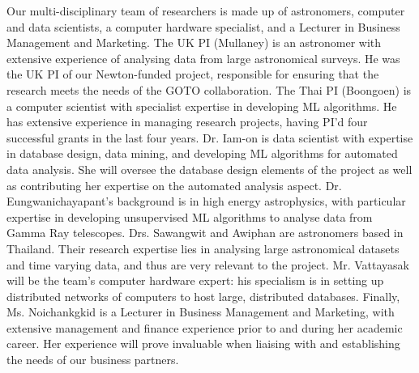 \documentclass[11pt]{article}
\begin{document}
  \noindent
  Our multi-disciplinary team of researchers is made up of astronomers, computer and data scientists, a computer hardware specialist, and a Lecturer in Business Management and Marketing. The UK PI (Mullaney) is an astronomer with extensive experience of analysing data from large astronomical surveys. He was the UK PI of our Newton-funded project, responsible for ensuring that the research meets the needs of the GOTO collaboration. The Thai PI (Boongoen) is a computer scientist with specialist expertise in developing ML algorithms. He has extensive experience in managing research projects, having PI'd four successful grants in the last four years. Dr. Iam-on is data scientist with expertise in database design, data mining, and developing ML algorithms for automated data analysis. She will oversee the database design elements of the project as well as contributing her expertise on the automated analysis aspect. Dr. Eungwanichayapant's background is in high energy astrophysics, with particular expertise in developing unsupervised ML algorithms to analyse data from Gamma Ray telescopes. Drs. Sawangwit and Awiphan are astronomers based in Thailand. Their research expertise lies in analysing large astronomical datasets and time varying data, and thus are very relevant to the project. Mr. Vattayasak will be the team's computer hardware expert: his specialism is in setting up distributed networks of computers to host large, distributed databases. Finally, Ms. Noichankgkid is a Lecturer in Business Management and Marketing, with extensive management and finance experience prior to and during her academic career. Her experience will prove invaluable when liaising with and establishing the needs of our business partners. 
  
  
  
  
\end{document}

